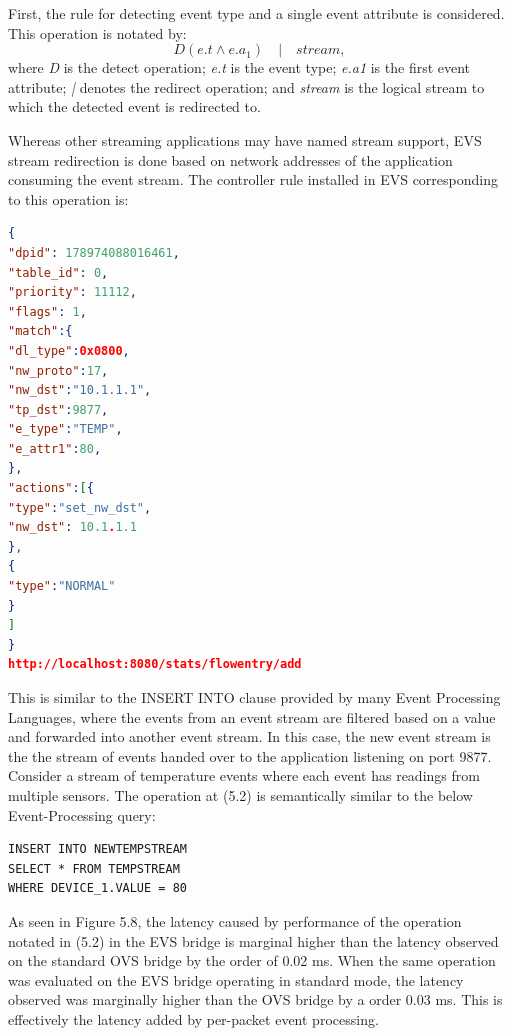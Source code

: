 First, the rule for detecting event type and  a single event attribute is considered. This operation is notated by: \begin{equation} D(e.t  \wedge e.a_1) \quad | \quad stream,  \end{equation}
where \textit{D} is the detect operation; \newline
\textit{e.t} is the event type; \newline
\textit{e.a1} is the first event attribute; \newline
\textit{|} denotes the redirect operation; \newline
and \textit{stream} is the logical stream to which the detected event is redirected to. \newline \newline

Whereas other streaming applications may have named stream support, EVS stream redirection is done based on network addresses of the application consuming the event stream. The controller rule installed in EVS corresponding to this operation is:

\begin{lstlisting}[language=json,firstnumber=1]
{
"dpid": 178974088016461,
"table_id": 0,
"priority": 11112,
"flags": 1,
"match":{
"dl_type":0x0800,
"nw_proto":17,
"nw_dst":"10.1.1.1",
"tp_dst":9877,
"e_type":"TEMP",
"e_attr1":80,
},
"actions":[{
"type":"set_nw_dst",
"nw_dst": 10.1.1.1
},
{
"type":"NORMAL"
}
]
}
http://localhost:8080/stats/flowentry/add \end{lstlisting}

This is similar to the INSERT INTO clause provided by many Event Processing Languages, where the events from an event stream are filtered based on a value and forwarded into another event stream. In this case, the new event stream is the the stream of events handed over to the application listening on port 9877. Consider a stream of temperature events where each event has readings from multiple sensors. The operation at (5.2) is semantically similar to the below Event-Processing  query:

\begin{verbatim}
INSERT INTO NEWTEMPSTREAM
SELECT * FROM TEMPSTREAM
WHERE DEVICE_1.VALUE = 80
\end{verbatim}

As seen in Figure 5.8, the latency caused by performance of the operation notated in (5.2) in the EVS bridge is marginal higher than the latency observed on the standard OVS bridge by the order of 0.02 ms. When the same operation was evaluated on the EVS bridge operating in standard mode, the latency observed was marginally higher than the OVS bridge by a order 0.03 ms. This is effectively the latency added by per-packet event processing. 

